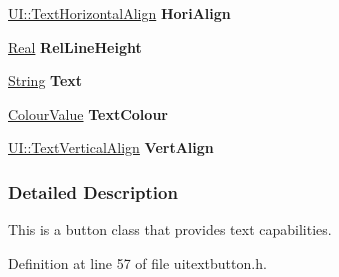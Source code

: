 \begin{DoxyCompactItemize}
\item 
\hypertarget{classMezzanine_1_1UI_1_1TextButton_aa8d80e6f9927a551645d78ff6fbf4579}{
\hyperlink{namespaceMezzanine_1_1UI_aebbd46e62bb20d958f1915c1ec6cc549}{UI::TextHorizontalAlign} {\bfseries HoriAlign}}
\label{classMezzanine_1_1UI_1_1TextButton_aa8d80e6f9927a551645d78ff6fbf4579}

\item 
\hypertarget{classMezzanine_1_1UI_1_1TextButton_a73953c117c0177981245aa0c2ac16de7}{
\hyperlink{namespaceMezzanine_a726731b1a7df72bf3583e4a97282c6f6}{Real} {\bfseries RelLineHeight}}
\label{classMezzanine_1_1UI_1_1TextButton_a73953c117c0177981245aa0c2ac16de7}

\item 
\hypertarget{classMezzanine_1_1UI_1_1TextButton_aebec7b24f94b7b55d35ecda839c09fee}{
\hyperlink{namespaceMezzanine_acf9fcc130e6ebf08e3d8491aebcf1c86}{String} {\bfseries Text}}
\label{classMezzanine_1_1UI_1_1TextButton_aebec7b24f94b7b55d35ecda839c09fee}

\item 
\hypertarget{classMezzanine_1_1UI_1_1TextButton_ac064280cca0332488a430e895f530288}{
\hyperlink{classMezzanine_1_1ColourValue}{ColourValue} {\bfseries TextColour}}
\label{classMezzanine_1_1UI_1_1TextButton_ac064280cca0332488a430e895f530288}

\item 
\hypertarget{classMezzanine_1_1UI_1_1TextButton_afbe6de2a54baa91ab29ff0d03320fc4b}{
\hyperlink{namespaceMezzanine_1_1UI_ab35e3845e2541698245262cc17147ae9}{UI::TextVerticalAlign} {\bfseries VertAlign}}
\label{classMezzanine_1_1UI_1_1TextButton_afbe6de2a54baa91ab29ff0d03320fc4b}

\end{DoxyCompactItemize}


\subsubsection{Detailed Description}
This is a button class that provides text capabilities. 

Definition at line 57 of file uitextbutton.h.



